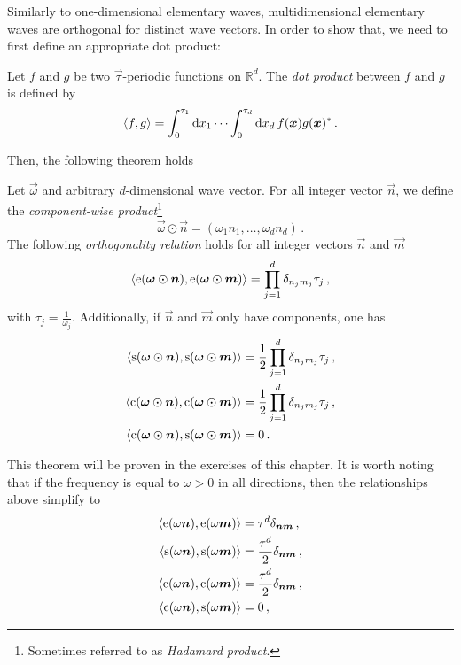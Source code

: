 Similarly to one-dimensional elementary waves, multidimensional elementary waves are
orthogonal for distinct wave vectors. In order to show that, we need to first define an
appropriate dot product:
\begin{definition}
  Let $f$ and $g$ be two $\vec{\tau}$-periodic functions on $\mathbb{R}^d$. The \emph{dot
  product} between $f$ and $g$ is defined by
  \begin{equation}
    \braket{f,g}=\int_0^{\tau_1}\mathrm{d} x_1\cdots\int_0^{\tau_d}\mathrm{d} x_d\,
    f(\bm{x})g(\bm{x})^*\,.
  \end{equation}
\end{definition}
Then, the following theorem holds
\begin{theorem}
  \label{thm:nd-orth}
  Let $\vec{\omega}$ and arbitrary $d$-dimensional wave vector. For all integer vector
  $\vec{n}$, we define the \emph{component-wise product}\footnote{Sometimes referred to as
  \emph{Hadamard product}.}
  \begin{equation}
    \vec{\omega}\odot\vec{n}=(\omega_1n_1,\dots,\omega_dn_d)\,.
  \end{equation}
  The following \emph{orthogonality relation} holds for all integer vectors $\vec{n}$ and
  $\vec{m}$
  \begin{align}
    \braket{\operatorname{e}(\bm{\omega}\odot\bm{n}),\operatorname{e}(\bm{\omega}\odot\bm{m})}
    =\prod_{j=1}^{d}\delta_{n_jm_j}\tau_j\,,
  \end{align}
  with $\tau_j=\frac{1}{\omega_j}$. Additionally, if $\vec{n}$ and $\vec{m}$ only have
  components, one has
  \begin{align}
    \braket{\operatorname{s}(\bm{\omega}\odot\bm{n}),\operatorname{s}(\bm{\omega}\odot\bm{m})}
    &=\frac{1}{2}\prod_{j=1}^{d}\delta_{n_jm_j}\tau_j\,,\\
    \braket{\operatorname{c}(\bm{\omega}\odot\bm{n}),\operatorname{c}(\bm{\omega}\odot\bm{m})}
    &=\frac{1}{2}\prod_{j=1}^{d}\delta_{n_jm_j}\tau_j\,,\\
    \braket{\operatorname{c}(\bm{\omega}\odot\bm{n}),\operatorname{s}(\bm{\omega}\odot\bm{m})}&=0\,.
  \end{align}
\end{theorem}
This theorem will be proven in the exercises of this chapter. It is worth noting that if
the frequency is equal to $\omega>0$ in all directions, then the relationships above
simplify to
\begin{align}
  \braket{\operatorname{e}(\omega\bm{n}),\operatorname{e}(\omega\bm{m})}
  &=\tau^d\delta_{\bm{n}\bm{m}}\,,\\
  \braket{\operatorname{s}(\omega\bm{n}),\operatorname{s}(\omega\bm{m})}
  &=\frac{\tau^d}{2}\delta_{\bm{n}\bm{m}}\,,\\
  \braket{\operatorname{c}(\omega\bm{n}),\operatorname{c}(\omega\bm{m})}
  &=\frac{\tau^d}{2}\delta_{\bm{n}\bm{m}}\,,\\
  \braket{\operatorname{c}(\omega\bm{n}),\operatorname{s}(\omega\bm{m})}&=0\,,
\end{align}

